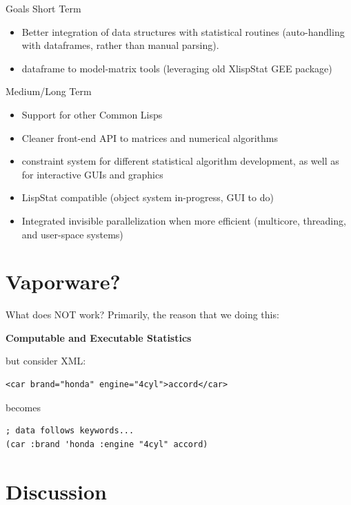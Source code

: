 \documentclass{beamer}
\begin{document}
\begin{frame}{Goals}
  Short Term
  \begin{itemize}
  \item Better integration of data structures with statistical routines
    (auto-handling with dataframes, rather than manual parsing). 
  \item dataframe to model-matrix tools (leveraging old XlispStat GEE
    package)
  \end{itemize}
  Medium/Long Term 
  \begin{itemize}
  \item Support for other Common Lisps
  \item Cleaner front-end API to matrices and numerical algorithms
  \item constraint system for different statistical algorithm
    development, as well as for interactive GUIs and graphics
  \item LispStat compatible (object system in-progress, GUI to do)
  \item Integrated invisible parallelization when more efficient
    (multicore, threading, and user-space systems)
  \end{itemize}
\end{frame}


\section{Vaporware?}

\begin{frame}[fragile]{What does NOT work?}
  Primarily, the reason that we doing this:
  
  \textbf{Computable and Executable Statistics}

  but consider XML:
\begin{verbatim}
<car brand="honda" engine="4cyl">accord</car>
\end{verbatim}
becomes
\begin{verbatim}
; data follows keywords...
(car :brand 'honda :engine "4cyl" accord)
\end{verbatim}
\end{frame}

\section{Discussion}
\end{document}
